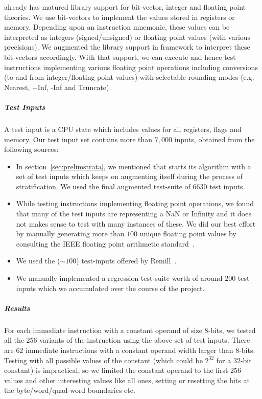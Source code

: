 \K already has matured library support for bit-vector, integer and floating point theories. We use bit-vectors to implement the values stored in registers or memory. Depending upon an instruction mnemonic, these values can be interpreted as integers (signed/unsigned) or floating point values (with various precisions).  We augmented the library support in \K framework to interpret these bit-vectors accordingly. With that support, we can execute and hence test instructions implementing various floating point operations including conversions (to and from integer/floating point values) with selectable rounding modes (e.g. Nearest, +Inf, -Inf and Truncate).   

\subparagraph{Test Inputs} %
A test input is a CPU state which includes values for all registers, flags and memory. Our test input set contains more than $7,000$ inputs, obtained from the following sources: 
\begin{itemize}
    \item In section~\ref{sec:prelimstrata}, we mentioned that \Strata starts its algorithm with a set of test inputs which keeps on augmenting itself during the process of stratification. We used the final augmented test-suite of  $6630$ test inputs.
    
    \item While testing instructions implementing floating point operations, we found that many of the test inputs are representing a NaN or Infinity and it does not makes sense to test with many instances of these. We did our best effort by manually generating more than $100$ unique floating point values by  consulting the IEEE floating point arithmetic standard~\cite{FP}.
    \item We used the (${\sim}100$) test-inputs offered by Remill~\cite{Remill}.
    \item We manually implemented a regression test-suite worth of around $200$ test-inputs which we accumulated over the course of the project. 
\end{itemize}  

\subparagraph{Results}
For each immediate instruction with a constant operand of size $8$-bits, we tested all the $256$ variants of the instruction using the above set of test inputs. There are $62$ immediate instructions  with a constant operand width larger than $8$-bits.  Testing with all possible values of the constant (which could be $2^{32}$ for a $32$-bit constant) is impractical, so we limited the constant operand to the first $256$ values and other interesting values like  all ones, setting or resetting the bits at the byte/word/quad-word boundaries etc.  

